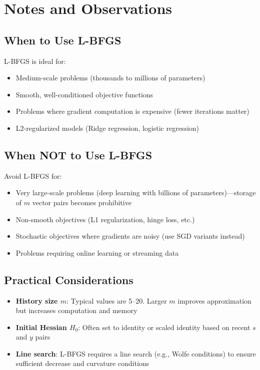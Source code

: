 \documentclass[11pt, a4paper, oneside]{article}
\begin{document}
\section{Notes and Observations}

\subsection{When to Use L-BFGS}

L-BFGS is ideal for:
\begin{itemize}
    \item Medium-scale problems (thousands to millions of parameters)
    \item Smooth, well-conditioned objective functions
    \item Problems where gradient computation is expensive (fewer iterations matter)
    \item L2-regularized models (Ridge regression, logistic regression)
\end{itemize}

\subsection{When NOT to Use L-BFGS}

Avoid L-BFGS for:
\begin{itemize}
    \item Very large-scale problems (deep learning with billions of parameters)---storage of $m$ vector pairs becomes prohibitive
    \item Non-smooth objectives (L1 regularization, hinge loss, etc.)
    \item Stochastic objectives where gradients are noisy (use SGD variants instead)
    \item Problems requiring online learning or streaming data
\end{itemize}

\subsection{Practical Considerations}

\begin{itemize}
    \item \textbf{History size $m$}: Typical values are 5--20. Larger $m$ improves approximation but increases computation and memory
    \item \textbf{Initial Hessian $H_0$}: Often set to identity or scaled identity based on recent $s$ and $y$ pairs
    \item \textbf{Line search}: L-BFGS requires a line search (e.g., Wolfe conditions) to ensure sufficient decrease and curvature conditions
\end{itemize}
\end{document}
